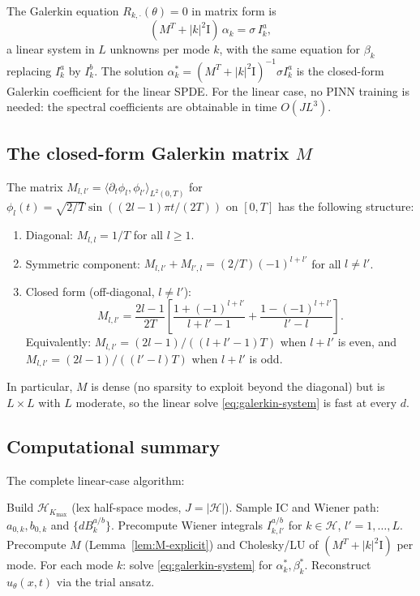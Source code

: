 The Galerkin equation $R_{k, \cdot}(\theta) = 0$ in matrix form is
\begin{equation}
(M^T + |k|^2 \mathrm{I})\,\alpha_k = \sigma\,I_k^a,
\label{eq:galerkin-system}
\end{equation}
a linear system in $L$ unknowns per mode $k$, with the same equation
for $\beta_k$ replacing $I_k^a$ by $I_k^b$. The solution
$\alpha_k^* = (M^T + |k|^2\mathrm{I})^{-1}\sigma I_k^a$ is the
closed-form Galerkin coefficient for the linear SPDE. For the linear
case, no PINN training is needed: the spectral coefficients are
obtainable in time $O(JL^3)$.

\subsection{The closed-form Galerkin matrix $M$}
\label{sec:method:M}

\begin{lemma}
\label{lem:M-explicit}
The matrix $M_{l, l'} = \langle \partial_t \phi_l, \phi_{l'}
\rangle_{L^2(0, T)}$ for $\phi_l(t) = \sqrt{2/T}\sin((2l-1)\pi t/(2T))$
on $[0, T]$ has the following structure:
\begin{enumerate}
\item Diagonal: $M_{l, l} = 1/T$ for all $l \ge 1$.
\item Symmetric component: $M_{l, l'} + M_{l', l} = (2/T)(-1)^{l + l'}$
for all $l \ne l'$.
\item Closed form (off-diagonal, $l \ne l'$):
$$
M_{l, l'} = \frac{2l-1}{2T}\left[\frac{1+(-1)^{l+l'}}{l+l'-1}
+ \frac{1-(-1)^{l+l'}}{l'-l}\right].
$$
Equivalently: $M_{l,l'} = (2l-1)/((l+l'-1)T)$ when $l+l'$ is even,
and $M_{l,l'} = (2l-1)/((l'-l)T)$ when $l+l'$ is odd.
\end{enumerate}
\end{lemma}

In particular, $M$ is dense (no sparsity to exploit beyond the
diagonal) but is $L \times L$ with $L$ moderate, so the linear solve
\eqref{eq:galerkin-system} is fast at every $d$.

\subsection{Computational summary}
\label{sec:method:summary}

The complete linear-case algorithm:

\begin{algorithm}[h]
\caption{Closed-form half-period Galerkin solve}
\label{alg:halfperiod-solve}
\begin{algorithmic}[1]
\State Build $\mathcal{H}_{K_{\max}}$ (lex half-space modes, $J = |\mathcal{H}|$).
\State Sample IC and Wiener path: $a_{0,k}, b_{0,k}$ and $\{dB_k^{a/b}\}$.
\State Precompute Wiener integrals $I_{k, l'}^{a/b}$ for $k \in \mathcal{H}$, $l' = 1, \ldots, L$.
\State Precompute $M$ (Lemma~\ref{lem:M-explicit}) and Cholesky/LU of $(M^T + |k|^2 \mathrm{I})$ per mode.
\State For each mode $k$: solve \eqref{eq:galerkin-system} for $\alpha_k^*, \beta_k^*$.
\State Reconstruct $u_\theta(x, t)$ via the trial ansatz.
\end{algorithmic}
\end{algorithm}

